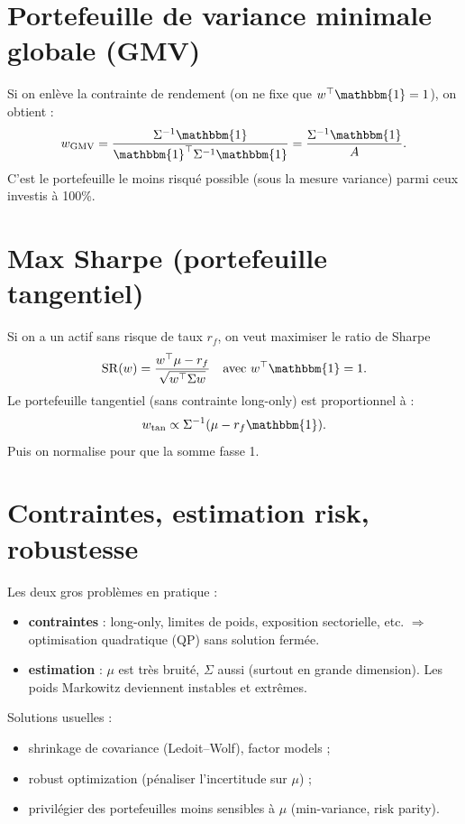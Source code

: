 \documentclass[11pt,a4paper]{report}
\newcommand{\1}{\mathbbm{1}}
\theoremstyle{definition}
\theoremstyle{plain}
\theoremstyle{remark}
\begin{document}
\section{Portefeuille de variance minimale globale (GMV)}
Si on enlève la contrainte de rendement (on ne fixe que $w^\top \1=1$),
on obtient :
\[
w_{\mathrm{GMV}} = \frac{\Sigma^{-1}\1}{\1^\top \Sigma^{-1}\1}=\frac{\Sigma^{-1}\1}{A}.
\]
C'est le portefeuille le moins risqué possible (sous la mesure variance) parmi ceux investis à 100\%.

\section{Max Sharpe (portefeuille tangentiel)}
Si on a un actif sans risque de taux $r_f$,
on veut maximiser le ratio de Sharpe
\[
\mathrm{SR}(w)=\frac{w^\top \mu - r_f}{\sqrt{w^\top \Sigma w}}
\quad \text{avec } w^\top \1 = 1.
\]
Le portefeuille tangentiel (sans contrainte long-only) est proportionnel à :
\[
w_{\mathrm{tan}} \propto \Sigma^{-1}(\mu - r_f \1).
\]
Puis on normalise pour que la somme fasse 1.

\section{Contraintes, estimation risk, robustesse}
\label{sec:markowitz_limits}
Les deux gros problèmes en pratique :
\begin{itemize}
  \item \textbf{contraintes} : long-only, limites de poids, exposition sectorielle, etc. $\Rightarrow$ optimisation quadratique (QP) sans solution fermée.
  \item \textbf{estimation} : $\mu$ est très bruité, $\Sigma$ aussi (surtout en grande dimension). Les poids Markowitz deviennent instables et extrêmes.
\end{itemize}
Solutions usuelles :
\begin{itemize}
  \item shrinkage de covariance (Ledoit--Wolf), factor models ;
  \item robust optimization (pénaliser l'incertitude sur $\mu$) ;
  \item privilégier des portefeuilles moins sensibles à $\mu$ (min-variance, risk parity).
\end{itemize}
\end{document}

